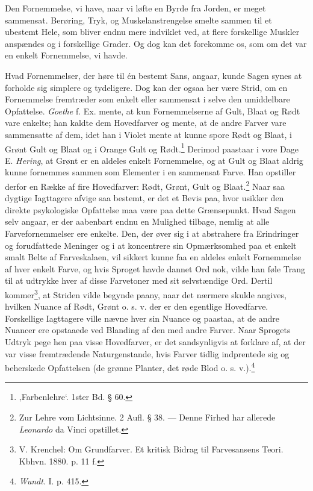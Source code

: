 \documentclass[12pt,a4paper,openany]{book}
\newcommand{\opage}[1]{\marginnote{\footnotesize\textit{[#1]}}}
\begin{document}
Den Fornemmelse, vi have, naar vi løfte en Byrde fra Jorden, er meget
sammensat. Berøring, Tryk, og Muskelanstrengelse smelte sammen til et
ubestemt Hele, som bliver endnu mere indviklet ved, at flere forskellige
Muskler anspændes og i forskellige Grader. Og dog kan det forekomme os,
som om det var en enkelt Fornemmelse, vi havde.

Hvad Fornemmelser, der høre til én bestemt Sans, angaar, kunde Sagen
synes at forholde sig simplere og tydeligere. Dog kan der ogsaa her være
Strid, om en Fornemmelse fremtræder som enkelt eller sammensat i selve
den umiddelbare Opfattelse. \emph{Goethe} f. Ex. mente, at kun
Fornemmelserne af Gult, Blaat og Rødt vare enkelte; han kaldte dem
Hovedfarver og mente, at de andre Farver vare sammensatte af dem, idet
han i Violet mente at kunne spore Rødt og Blaat, i Grønt Gult og Blaat
og i Orange Gult og Rødt.\footnote[1]{%
‚Farbenlehre‘. 1ster Bd. § 60.}
Derimod paastaar i vore Dage E. \emph{Hering}, at Grønt er en aldeles
enkelt Fornemmelse, og at Gult og Blaat aldrig kunne fornemmes sammen
som
\opage{123}Elementer i en sammensat Farve. Han opstiller derfor en Række
af fire Hovedfarver: Rødt, Grønt, Gult og Blaat.\footnote[1]{Zur Lehre
vom Lichtsinne. 2 Aufl. § 38. --- Denne Firhed har allerede
\emph{Leonardo} da Vinci opstillet.} Naar saa dygtige Iagttagere afvige
saa bestemt, er det et Bevis paa, hvor usikker den direkte psykologiske
Opfattelse maa være paa dette Grænsepunkt. Hvad Sagen selv angaar, er
der aabenbart endnu en Mulighed tilbage, nemlig at alle
Farvefornemmelser ere enkelte. Den, der øver sig i at abstrahere fra
Erindringer og forudfattede Meninger og i at koncentrere sin
Opmærksomhed paa et enkelt smalt Belte af Farveskalaen, vil sikkert
kunne faa en aldeles enkelt Fornemmelse af hver enkelt Farve, og hvis
Sproget havde dannet Ord nok, vilde han føle Trang til at udtrykke hver
af disse Farvetoner med sit selvstændige Ord. Dertil
kommer\footnote[2]{V. Krenchel: Om Grundfarver. Et kritisk Bidrag til
Farvesansens Teori. Kbhvn. 1880. p. 11 f.}, at Striden vilde begynde
paany, naar det nærmere skulde angives, hvilken Nuance af Rødt, Grønt o.
s. v. der er den egentlige Hovedfarve. Forskellige Iagttagere ville
nævne hver sin Nuance og paastaa, at de andre Nuancer ere opstaaede ved
Blanding af den med andre Farver. Naar Sprogets Udtryk pege hen paa
visse Hovedfarver, er det sandsynligvis at forklare af, at der var visse
fremtrædende Naturgenstande, hvis Farver tidlig indprentede sig og
beherskede Opfattelsen (de grønne Planter, det røde Blod o. s.
v.).\footnote[3]{\emph{Wundt}. I. p. 415.}
\end{document}
